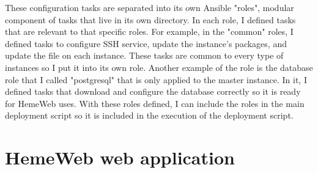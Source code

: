 These configuration tasks are separated into its own Ansible "roles", modular component of tasks that live in its own directory. In each role, I defined tasks that are relevant to that specific roles. For example, in the "common" roles, I defined tasks to configure SSH service, update the instance's packages, and update the  file on each instance. These tasks are common to every type of instances so I put it into its own role. Another  example of the role is the database role that I called "postgresql" that is only applied to the master instance. In it, I defined tasks that download and configure the database correctly so it is ready for HemeWeb uses. With these roles defined, I can include the roles in the main deployment script so it is included in the execution of the deployment script.
%
%




\section{HemeWeb web application}

